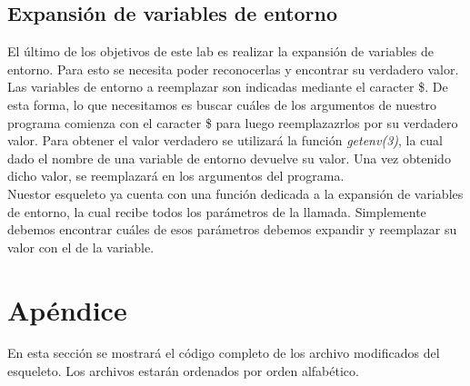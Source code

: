 \documentclass[a4paper, 12pt]{article}
\begin{document}
		\subsection{Expansión de variables de entorno}
		El último de los objetivos de este lab es realizar la expansión de variables de entorno. Para esto se necesita poder reconocerlas y encontrar su verdadero valor.\\
		
		Las variables de entorno a reemplazar son indicadas mediante el caracter \$. De esta forma, lo que necesitamos es buscar cuáles de los argumentos de nuestro programa comienza con el caracter \$ para luego reemplazazrlos por su verdadero valor. Para obtener el valor verdadero se utilizará la función \textit{getenv(3)}, la cual dado el nombre de una variable de entorno devuelve su valor. Una vez obtenido dicho valor, se reemplazará en los argumentos del programa.\\
		 
		Nuestor esqueleto ya cuenta con una función dedicada a la expansión de variables de entorno, la cual recibe todos los parámetros de la llamada. Simplemente debemos encontrar cuáles de esos parámetros debemos expandir y reemplazar su valor con el de la variable.\\
		
		
	\newpage
	\section{Apéndice}
	En esta sección se mostrará el código completo de los archivo modificados del esqueleto. Los archivos estarán ordenados por orden alfabético.\\
	
	
	\bigskip\bigskip\bigskip
	
	\bigskip\bigskip\bigskip
	
	
	
			
\end{document}

